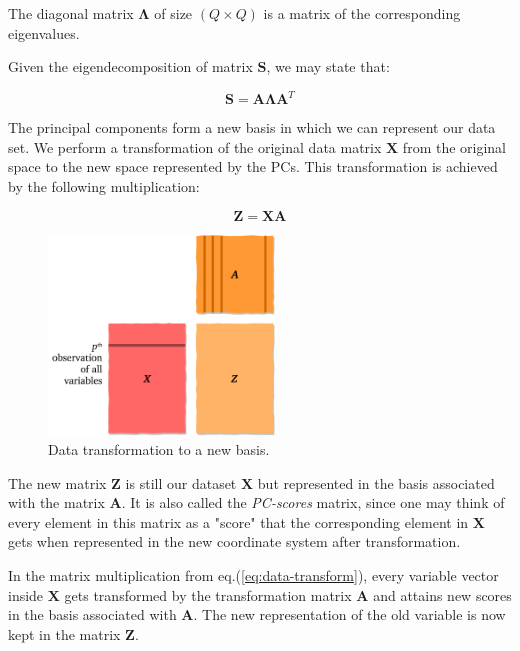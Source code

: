 \documentclass[10pt,twocolumn]{article}
\begin{document}
The diagonal matrix $\bm{\Lambda}$ of size $(Q \times Q)$ is a matrix of the corresponding eigenvalues.

Given the eigendecomposition of matrix $\bm{S}$, we may state that: 

\begin{equation} \label{eq:eig-dec-cov-matrix}
\bm{S} = \bm{A} \bm{\Lambda} \bm{A}^T
\end{equation}

The principal components form a new basis in which we can represent our data set. We perform a transformation of the original data matrix $\bm{X}$ from the original space to the new space represented by the PCs. This transformation is achieved by the following multiplication:

\begin{equation} \label{eq:data-transform}
\bm{Z} = \bm{X} \bm{A}
\end{equation}

\begin{figure}[H]
\centering\includegraphics[width=6cm]{data-transformation.png}
\caption{Data transformation to a new basis.}
\label{fig:data-transformation}
\end{figure}

The new matrix $\bm{Z}$ is still our dataset $\bm{X}$ but represented in the basis associated with the matrix $\bm{A}$. It is also called the \textit{PC-scores} matrix, since one may think of every element in this matrix as a "score" that the corresponding element in $\bm{X}$ gets when represented in the new coordinate system after transformation.




In the matrix multiplication from eq.(\ref{eq:data-transform}), every variable vector inside $\bm{X}$ gets transformed by the transformation matrix $\bm{A}$ and attains new scores in the basis associated with $\bm{A}$. The new representation of the old variable is now kept in the matrix $\bm{Z}$.
\end{document}
